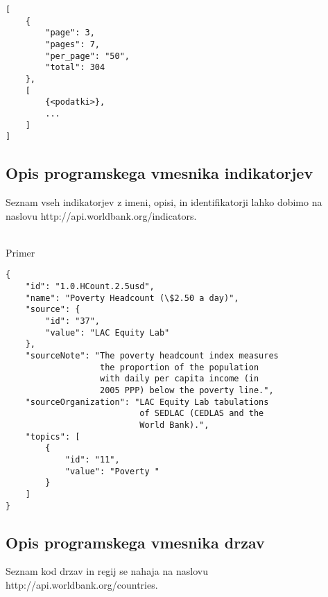 \begin{snippet}
\begin{center}
\begin{lstlisting}
[
    {
        "page": 3,
        "pages": 7,
        "per_page": "50",
        "total": 304
    },
    [
        {<podatki>},
        ...
    ]
]
\end{lstlisting}
\end{center}
\caption{Osnovna oblika odgovora programskega vmesnika Svetovne banke v obliki
JSON, ob veljavni poizvedbi. Prvi element opisuje kolicino dobljenih in vseh 
podatkov, drugi element pa vsebuje s stranjo in stevilom podatkov na stran 
doloceni izsek celotnih podatkov.}
\label{basic_response}
\end{snippet} 



\subsection{Opis programskega vmesnika indikatorjev}
Seznam vseh indikatorjev z imeni, opisi, in identifikatorji lahko dobimo na 
naslovu http://api.worldbank.org/indicators.

\ \\
Primer 


\begin{snippet}
\begin{center}
\begin{lstlisting}
{
    "id": "1.0.HCount.2.5usd",
    "name": "Poverty Headcount (\$2.50 a day)",
    "source": {
        "id": "37",
        "value": "LAC Equity Lab"
    },
    "sourceNote": "The poverty headcount index measures 
                   the proportion of the population
                   with daily per capita income (in 
                   2005 PPP) below the poverty line.",
    "sourceOrganization": "LAC Equity Lab tabulations
                           of SEDLAC (CEDLAS and the
                           World Bank).",
    "topics": [
        {
            "id": "11",
            "value": "Poverty "
        }
    ]
}
\end{lstlisting}
\end{center}
\caption{Podatki indikatorja stopnja revscine pri dohodku 2,5 dolarja na dan
("Poverty Headcount (\$2.50 a day)") v obliki JSON.}
\label{indicator_response}
\end{snippet} 



\subsection{Opis programskega vmesnika drzav}
Seznam kod drzav in regij se nahaja na naslovu 
http://api.worldbank.org/countries.


